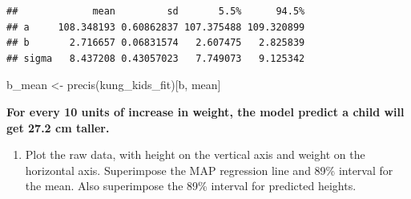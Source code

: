\documentclass[
]{book}
\newenvironment{Shaded}{\begin{snugshade}}{\end{snugshade}}
\newcommand{\FunctionTok}[1]{\textcolor[rgb]{0.00,0.00,0.00}{#1}}
\newcommand{\NormalTok}[1]{#1}
\newcommand{\OtherTok}[1]{\textcolor[rgb]{0.56,0.35,0.01}{#1}}
\newcommand{\StringTok}[1]{\textcolor[rgb]{0.31,0.60,0.02}{#1}}
\providecommand{\tightlist}{%
  \setlength{\itemsep}{0pt}\setlength{\parskip}{0pt}}
\begin{document}
\begin{verbatim}
##             mean         sd       5.5%      94.5%
## a     108.348193 0.60862837 107.375488 109.320899
## b       2.716657 0.06831574   2.607475   2.825839
## sigma   8.437208 0.43057023   7.749073   9.125342
\end{verbatim}

\begin{Shaded}
\begin{Highlighting}[]
\NormalTok{b\_mean }\OtherTok{\textless{}{-}} \FunctionTok{precis}\NormalTok{(kung\_kids\_fit)[}\StringTok{\textquotesingle{}b\textquotesingle{}}\NormalTok{, }\StringTok{\textquotesingle{}mean\textquotesingle{}}\NormalTok{]}
\end{Highlighting}
\end{Shaded}

\textbf{For every 10 units of increase in weight, the model predict a child will get 27.2 cm taller.}

\begin{enumerate}
\def\labelenumi{\alph{enumi}.}
\setcounter{enumi}{1}
\tightlist
\item
  Plot the raw data, with height on the vertical axis and weight on the horizontal axis. Superimpose the MAP regression line and 89\% interval for the mean. Also superimpose the 89\% interval for predicted heights.
\end{enumerate}
\end{document}
